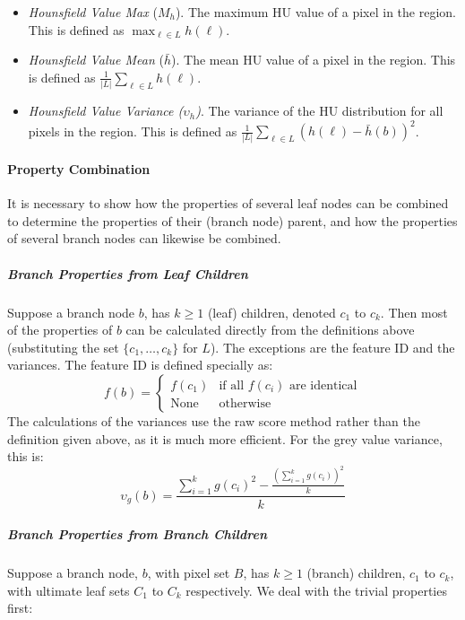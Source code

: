 \begin{itemize}
\item \emph{Hounsfield Value Max} ($M_h$). The maximum HU value of a pixel in the region. This is defined as $\displaystyle \max_{\ell \in L} h(\ell)$.

\item \emph{Hounsfield Value Mean} ($\bar{h}$). The mean HU value of a pixel in the region. This is defined as $\displaystyle \frac{1}{|L|} \sum_{\ell \in L} h(\ell)$.

\item \emph{Hounsfield Value Variance ($\upsilon_h$)}. The variance of the HU distribution for all pixels in the region. This is defined as $\displaystyle \frac{1}{|L|} \sum_{\ell \in L} (h(\ell) - \bar{h}(b))^2$.

\end{itemize}

\enlargethispage*{\baselineskip}

\paragraph{Property Combination}

It is necessary to show how the properties of several leaf nodes can be combined to determine the properties of their (branch node) parent, and how the properties of several branch nodes can likewise be combined.

\subparagraph{Branch Properties from Leaf Children}

Suppose a branch node $b$, has $k \ge 1$ (leaf) children, denoted $c_1$ to $c_k$. Then most of the properties of $b$ can be calculated directly from the definitions above (substituting the set $\{c_1,\ldots,c_k\}$ for $L$). The exceptions are the feature ID and the variances. The feature ID is defined specially as:
%
\[
f(b) = \left\{
\begin{array}{ll}
f(c_1) & \mbox{if all }f(c_i)\mbox{ are identical} \\
\mbox{None} & \mbox{otherwise}
\end{array}
\right.
\]
%
The calculations of the variances use the raw score method rather than the definition given above, as it is much more efficient. For the grey value variance, this is:
%
\[
\upsilon_g(b) = \frac{\sum_{i=1}^k g(c_i)^2 - \frac{(\sum_{i=1}^k g(c_i))^2}{k}}{k}
\]

\subparagraph{Branch Properties from Branch Children}

Suppose a branch node, $b$, with pixel set $B$, has $k \ge 1$ (branch) children, $c_1$ to $c_k$, with ultimate leaf sets $C_1$ to $C_k$ respectively. We deal with the trivial properties first:

